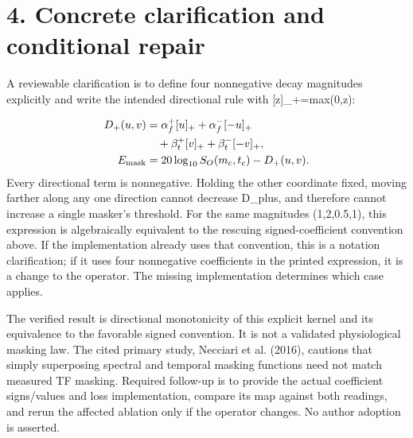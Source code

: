 \documentclass[10pt]{article}
\begin{document}
\section*{4. Concrete clarification and conditional repair}
A reviewable clarification is to define four nonnegative decay magnitudes explicitly and write the intended directional rule with [z]\_+=max(0,z):\par
\[\begin{aligned}D_+(u,v)&=\alpha_f^+[u]_++\alpha_f^-[-u]_+\\&\quad+\beta_t^+[v]_++\beta_t^-[-v]_+,\\ E_{\rm mask}&=20\log_{10}S_O(m_c,t_c)-D_+(u,v).\end{aligned}\] Every directional term is nonnegative. Holding the other coordinate fixed, moving farther along any one direction cannot decrease D\_plus, and therefore cannot increase a single masker’s threshold. For the same magnitudes (1,2,0.5,1), this expression is algebraically equivalent to the rescuing signed-coefficient convention above. If the implementation already uses that convention, this is a notation clarification; if it uses four nonnegative coefficients in the printed expression, it is a change to the operator. The missing implementation determines which case applies.\par
The verified result is directional monotonicity of this explicit kernel and its equivalence to the favorable signed convention. It is not a validated physiological masking law. The cited primary study, Necciari et al. (2016), cautions that simply superposing spectral and temporal masking functions need not match measured TF masking. Required follow-up is to provide the actual coefficient signs/values and loss implementation, compare its map against both readings, and rerun the affected ablation only if the operator changes. No author adoption is asserted.\par
\end{document}
